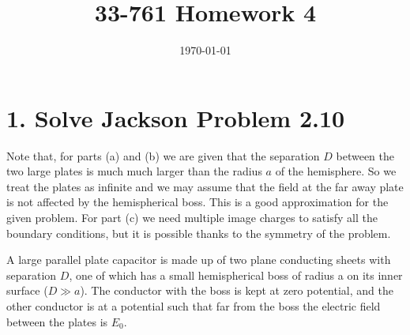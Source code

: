 \documentclass[a4paper,twoside]{article}
\title{33-761 Homework 4}
\date{\today}
\begin{document}
\maketitle

\section*{1. Solve Jackson Problem 2.10}%
\label{sec:solve_jackson_problem_2_10}
Note that, for parts (a) and (b) we are given that the separation $D$ between the two large plates is much much larger than the radius $a$ of the hemisphere. So we treat the plates as infinite and we may assume that the field at the far away plate is not affected by the hemispherical boss. This is a good approximation for the given problem. For part (c) we need multiple image charges to satisfy all the boundary conditions, but it is possible thanks to the symmetry of the problem.

\hr
A large parallel plate capacitor is made up of two plane conducting sheets with separation $D$, one of which has a small hemispherical boss of radius a on its inner surface ($D \gg a$). The conductor with the boss is kept at zero potential, and the other conductor is at a potential such that far from the boss the electric field between the plates is $E_0$.
\end{document}
